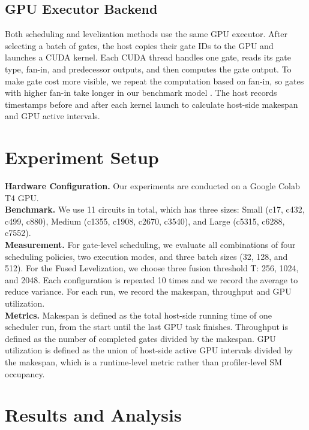 \documentclass[sigconf,screen,nonacm]{acmart}
\begin{document}
    \subsection{GPU Executor Backend}
    Both scheduling and levelization methods use the same GPU executor. After selecting a batch of gates, the host copies their gate IDs to the GPU and launches a CUDA kernel. Each CUDA thread handles one gate, reads its gate type, fan-in, and predecessor outputs, and then computes the gate output. To make gate cost more visible, we repeat the computation based on fan-in, so gates with higher fan-in take longer in our benchmark model \cite{lsim}. The host records timestamps before and after each kernel launch to calculate host-side makespan and GPU active intervals.

\section{Experiment Setup}
\label{sec:experiment_setup}
\textbf{Hardware Configuration.} Our experiments are conducted on a Google Colab T4 GPU. 
\\
\textbf{Benchmark.} We use 11 circuits \cite{lsim} in total, which has three sizes: Small (c17, c432, c499, c880), Medium (c1355, c1908, c2670, c3540), and Large (c5315, c6288, c7552). 
\\
\textbf{Measurement.} For gate-level scheduling, we evaluate all combinations of four scheduling policies, two execution modes, and three batch sizes (32, 128, and 512). For the Fused Levelization, we choose three fusion threshold T: 256, 1024, and 2048. Each configuration is repeated 10 times and we record the average to reduce variance. For each run, we record the makespan, throughput and GPU utilization. 
\\
\textbf{Metrics.} Makespan is defined as the total host-side running time of one scheduler run, from the start until the last GPU task finishes. Throughput is defined as the number of completed gates divided by the makespan. GPU utilization is defined as the union of host-side active GPU intervals divided by the makespan, which is a runtime-level metric rather than profiler-level SM occupancy.

\section{Results and Analysis}
\label{sec:results}
\end{document}
